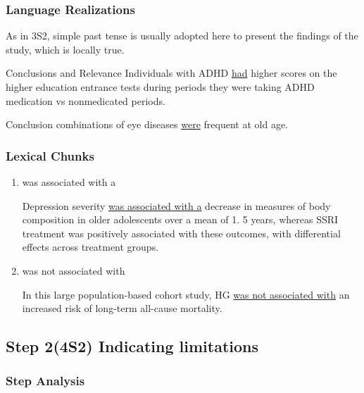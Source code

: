 \documentclass[a4paper]{ctexbook}
\begin{document}
    \subsubsection{Language Realizations}

    As in 3S2, simple past tense is usually adopted here to present the findings of the study, which is locally true.

    \begin{eg}{}
      Conclusions and Relevance Individuals with ADHD \uline{had} higher scores on the higher education entrance tests during periods they were taking ADHD medication vs nonmedicated periods.
    \end{eg}

    \begin{eg}{}
      Conclusion combinations of eye diseases \uline{were} frequent at old age. 
    \end{eg}

    \subsubsection{Lexical Chunks}

    \begin{enumerate}
      \item was associated with a
      \begin{eg}{}
        Depression severity \uline{was associated with a} decrease in measures of body composition in older adolescents over a mean of 1. 5 years, whereas SSRI treatment was positively associated with these outcomes, with differential effects across treatment groups.
      \end{eg}
      \item was not associated with
      \begin{eg}{}
        In this large population-based cohort study, HG \uline{was not associated with} an increased risk of long-term all-cause mortality.
      \end{eg}
    \end{enumerate}

  \subsection{Step 2(4S2) Indicating limitations}
    \subsubsection{Step Analysis}
\end{document}
